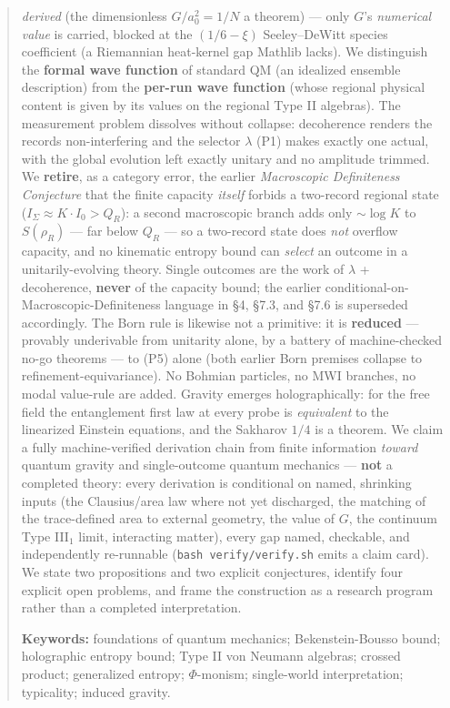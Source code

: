 \documentclass[11pt,a4paper]{article}
\begin{document}
\begin{abstract}
\emph{derived} (the dimensionless $G/a_0^2 = 1/N$ a theorem) — only $G$'s \emph{numerical value} is carried, blocked at the $(1/6-\xi)$ Seeley–DeWitt species coefficient (a Riemannian heat-kernel gap Mathlib lacks). We distinguish the \textbf{formal wave function} of standard QM (an idealized ensemble description) from the \textbf{per-run wave function} (whose regional physical content is given by its values on the regional Type II algebras). The measurement problem dissolves without collapse: decoherence renders the records non-interfering and the selector $\lambda$ (P1) makes exactly one actual, with the global evolution left exactly unitary and no amplitude trimmed. We \textbf{retire}, as a category error, the earlier \emph{Macroscopic Definiteness Conjecture} that the finite capacity \emph{itself} forbids a two-record regional state ($I_\Sigma \approx K\cdot I_0 > Q_R$): a second macroscopic branch adds only $\sim\!\log K$ to $S(\rho_R)$ — far below $Q_R$ — so a two-record state does \emph{not} overflow capacity, and no kinematic entropy bound can \emph{select} an outcome in a unitarily-evolving theory. Single outcomes are the work of $\lambda$ + decoherence, \textbf{never} of the capacity bound; the earlier conditional-on-Macroscopic-Definiteness language in §4, §7.3, and §7.6 is superseded accordingly. The Born rule is likewise not a primitive: it is \textbf{reduced} — provably underivable from unitarity alone, by a battery of machine-checked no-go theorems — to (P5) alone (both earlier Born premises collapse to refinement-equivariance). No Bohmian particles, no MWI branches, no modal value-rule are added. Gravity emerges holographically: for the free field the entanglement first law at every probe is \emph{equivalent} to the linearized Einstein equations, and the Sakharov $1/4$ is a theorem. We claim a fully machine-verified derivation chain from finite information \emph{toward} quantum gravity and single-outcome quantum mechanics — \textbf{not} a completed theory: every derivation is conditional on named, shrinking inputs (the Clausius/area law where not yet discharged, the matching of the trace-defined area to external geometry, the value of $G$, the continuum Type III$_1$ limit, interacting matter), every gap named, checkable, and independently re-runnable (\texttt{bash verify/verify.sh} emits a claim card). We state two propositions and two explicit conjectures, identify four explicit open problems, and frame the construction as a research program rather than a completed interpretation.


\medskip
\noindent\textbf{Keywords:} foundations of quantum mechanics; Bekenstein-Bousso bound; holographic entropy bound; Type II von Neumann algebras; crossed product; generalized entropy; $\Phi$-monism; single-world interpretation; typicality; induced gravity.


\end{abstract}
\end{document}
